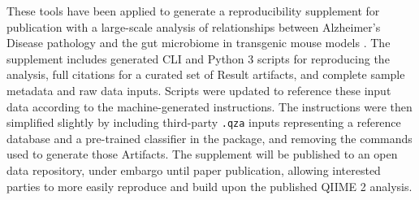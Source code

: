 These tools have been applied to generate a reproducibility supplement for
publication with a large-scale analysis of relationships between Alzheimer’s
Disease pathology and the gut microbiome in transgenic mouse models \parencite{borsom_predicting_2022}.
The supplement includes generated CLI and Python 3 scripts for reproducing the
analysis, full citations for a curated set of Result artifacts, and complete
sample metadata and raw data inputs. Scripts were updated to reference these
input data according to the machine-generated instructions. The instructions
were then simplified slightly by including third-party \texttt{.qza} inputs representing
a reference database and a pre-trained classifier in the package, and removing
the commands used to generate those Artifacts. The supplement will be published
to an open data repository, under embargo until paper publication, allowing
interested parties to more easily reproduce and build upon the published QIIME 2
analysis.

